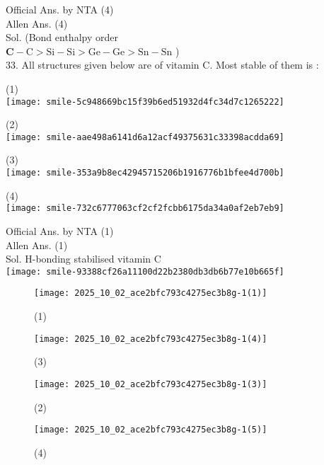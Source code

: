 \documentclass[10pt]{article}
\begin{document}
Official Ans. by NTA (4)\\
Allen Ans. (4)\\
Sol. (Bond enthalpy order\\
\(\mathbf{C}-\mathrm{C}>\mathrm{Si}-\mathrm{Si}>\mathrm{Ge}-\mathrm{Ge}>\mathrm{Sn}-\mathrm{Sn}\) )\\
33. All structures given below are of vitamin C. Most stable of them is :

(1)\\
\texttt{[image: smile-5c948669bc15f39b6ed51932d4fc34d7c1265222]}

(2)\\
\texttt{[image: smile-aae498a6141d6a12acf49375631c33398acdda69]}

(3)\\
\texttt{[image: smile-353a9b8ec42945715206b1916776b1bfee4d700b]}

(4)\\
\texttt{[image: smile-732c6777063cf2cf2fcbb6175da34a0af2eb7eb9]}

Official Ans. by NTA (1)\\
Allen Ans. (1)\\
Sol. H-bonding stabilised vitamin C\\
\texttt{[image: smile-93388cf26a11100d22b2380db3db6b77e10b665f]}

\begin{figure}[h]
\begin{center}
\captionsetup{labelformat=empty}
\caption{(1)}
  \texttt{[image: 2025\_10\_02\_ace2bfc793c4275ec3b8g-1(1)]}
\end{center}
\end{figure}

\begin{figure}[h]
\begin{center}
\captionsetup{labelformat=empty}
\caption{(3)}
  \texttt{[image: 2025\_10\_02\_ace2bfc793c4275ec3b8g-1(4)]}
\end{center}
\end{figure}

\begin{figure}[h]
\begin{center}
\captionsetup{labelformat=empty}
\caption{(2)}
  \texttt{[image: 2025\_10\_02\_ace2bfc793c4275ec3b8g-1(3)]}
\end{center}
\end{figure}

\begin{figure}[h]
\begin{center}
\captionsetup{labelformat=empty}
\caption{(4)}
  \texttt{[image: 2025\_10\_02\_ace2bfc793c4275ec3b8g-1(5)]}
\end{center}
\end{figure}
\end{document}

